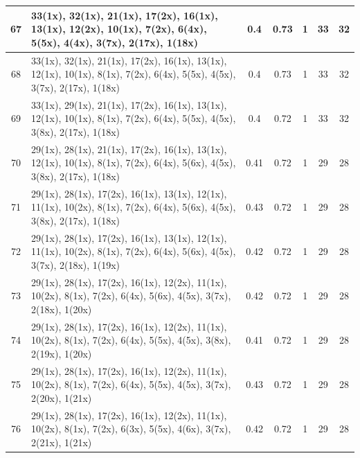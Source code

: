 \begin{small}
\begin{longtable}{|c|p{4cm}|c|c|c|c|c|}
  67 & 33(1x), 32(1x), 21(1x), 17(2x), 16(1x), 13(1x), 12(2x), 10(1x), 7(2x), 6(4x), 5(5x), 4(4x), 3(7x), 2(17x), 1(18x) & \cellcolor{colorGood}  0.4 & \cellcolor{colorGood} 0.73 & 1 & 33 & \cellcolor{colorBad} 32 \\   \hline
  68 & 33(1x), 32(1x), 21(1x), 17(2x), 16(1x), 13(1x), 12(1x), 10(1x), 8(1x), 7(2x), 6(4x), 5(5x), 4(5x), 3(7x), 2(17x), 1(18x) & \cellcolor{colorGood}  0.4 & \cellcolor{colorGood} 0.73 & 1 & 33 & \cellcolor{colorBad} 32 \\   \hline
  69 & 33(1x), 29(1x), 21(1x), 17(2x), 16(1x), 13(1x), 12(1x), 10(1x), 8(1x), 7(2x), 6(4x), 5(5x), 4(5x), 3(8x), 2(17x), 1(18x) & \cellcolor{colorGood}  0.4 & \cellcolor{colorGood} 0.72 & 1 & 33 & \cellcolor{colorBad} 32 \\   \hline
  70 & 29(1x), 28(1x), 21(1x), 17(2x), 16(1x), 13(1x), 12(1x), 10(1x), 8(1x), 7(2x), 6(4x), 5(6x), 4(5x), 3(8x), 2(17x), 1(18x) & \cellcolor{colorGood}  0.41 & \cellcolor{colorGood} 0.72 & 1 & 29 & \cellcolor{colorBad} 28 \\   \hline
  71 & 29(1x), 28(1x), 17(2x), 16(1x), 13(1x), 12(1x), 11(1x), 10(2x), 8(1x), 7(2x), 6(4x), 5(6x), 4(5x), 3(8x), 2(17x), 1(18x) & \cellcolor{colorGood}  0.43 & \cellcolor{colorGood} 0.72 & 1 & 29 & \cellcolor{colorBad} 28 \\   \hline
  72 & 29(1x), 28(1x), 17(2x), 16(1x), 13(1x), 12(1x), 11(1x), 10(2x), 8(1x), 7(2x), 6(4x), 5(6x), 4(5x), 3(7x), 2(18x), 1(19x) & \cellcolor{colorGood}  0.42 & \cellcolor{colorGood} 0.72 & 1 & 29 & \cellcolor{colorBad} 28 \\   \hline
  73 & 29(1x), 28(1x), 17(2x), 16(1x), 12(2x), 11(1x), 10(2x), 8(1x), 7(2x), 6(4x), 5(6x), 4(5x), 3(7x), 2(18x), 1(20x) & \cellcolor{colorGood}  0.42 & \cellcolor{colorGood} 0.72 & 1 & 29 & \cellcolor{colorBad} 28 \\   \hline
  74 & 29(1x), 28(1x), 17(2x), 16(1x), 12(2x), 11(1x), 10(2x), 8(1x), 7(2x), 6(4x), 5(5x), 4(5x), 3(8x), 2(19x), 1(20x) & \cellcolor{colorGood}  0.41 & \cellcolor{colorGood} 0.72 & 1 & 29 & \cellcolor{colorBad} 28 \\   \hline
  75 & 29(1x), 28(1x), 17(2x), 16(1x), 12(2x), 11(1x), 10(2x), 8(1x), 7(2x), 6(4x), 5(5x), 4(5x), 3(7x), 2(20x), 1(21x) & \cellcolor{colorGood}  0.43 & \cellcolor{colorGood} 0.72 & 1 & 29 & \cellcolor{colorBad} 28 \\   \hline
  76 & 29(1x), 28(1x), 17(2x), 16(1x), 12(2x), 11(1x), 10(2x), 8(1x), 7(2x), 6(3x), 5(5x), 4(6x), 3(7x), 2(21x), 1(21x) & \cellcolor{colorGood}  0.42 & \cellcolor{colorGood} 0.72 & 1 & 29 & \cellcolor{colorBad} 28 \\   \hline

\end{longtable}
\end{small}
